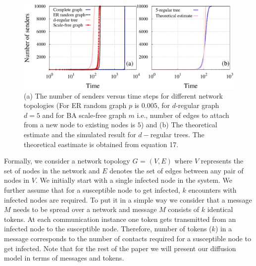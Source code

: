  
 \begin{figure}[htpb]
  \centering
  \includegraphics[scale=0.38]{./texfiles/Chapter_3/epl/figs1/plot_all.eps}
 
 \caption{\label{fig1} (a) The number of senders versus time steps for different network topologies (For ER random graph $p$ is $0.005$, for $d$-regular graph $d=5$ and for BA scale-free graph $m$ i.e., number of edges to attach from a new node to existing nodes is $5$) and 
 (b) The theoretical estimate and the simulated result for $d-$regular trees. The theoretical eastimate is obtained from equation 17.}
\end{figure}
 
 
Formally, we consider a network topology $G$ = $(V,E)$ where $V$ represents the set of
nodes in the network and $E$ denotes the set of edges between any pair of nodes in $%
V $. We initially start with a single infected node in the system. We
further assume that for a susceptible node to get infected,  $k$ encounters
with infected nodes are required. To put it in a simple way we consider that
a message $M$ needs to be spread over a network and message $M$ consists of $%
k$  identical tokens. At each communication instance one token gets transmitted from an
infected node to the susceptible node. Therefore, number of tokens ($k$) in a
message corresponds to the number of contacts required for a susceptible
node to get infected. Note that for the rest of the paper we will present
our diffusion model in terms of messages and tokens. 

